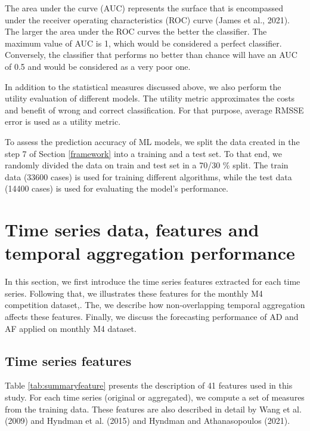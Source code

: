 \documentclass[]{elsarticle} %
\begin{document}
The area under the curve (AUC) represents the surface that is
encompassed under the receiver operating characteristics (ROC) curve
(James et al., 2021). The larger the area under the ROC curves the
better the classifier. The maximum value of AUC is 1, which would be
considered a perfect classifier. Conversely, the classifier that
performs no better than chance will have an AUC of 0.5 and would be
considered as a very poor one.

In addition to the statistical measures discussed above, we also perform
the utility evaluation of different models. The utility metric
approximates the costs and benefit of wrong and correct classification.
For that purpose, average RMSSE error is used as a utility metric.

To assess the prediction accuracy of ML models, we split the data
created in the step 7 of Section \ref{framework} into a training and a
test set. To that end, we randomly divided the data on train and test
set in a 70/30 \% split. The train data (33600 cases) is used for
training different algorithms, while the test data (14400 cases) is used
for evaluating the model's performance.

\hypertarget{tsfeature}{%
\section{Time series data, features and temporal aggregation
performance}\label{tsfeature}}

In this section, we first introduce the time series features extracted
for each time series. Following that, we illustrates these features for
the monthly M4 competition dataset,. The, we describe how
non-overlapping temporal aggregation affects these features. Finally, we
discuss the forecasting performance of AD and AF applied on monthly M4
dataset.

\hypertarget{time-series-features}{%
\subsection{Time series features}\label{time-series-features}}

Table \ref{tab:summaryfeature} presents the description of 41 features
used in this study. For each time series (original or aggregated), we
compute a set of measures from the training data. These features are
also described in detail by Wang et al. (2009) and Hyndman et al. (2015)
and Hyndman and Athanasopoulos (2021).
\end{document}
